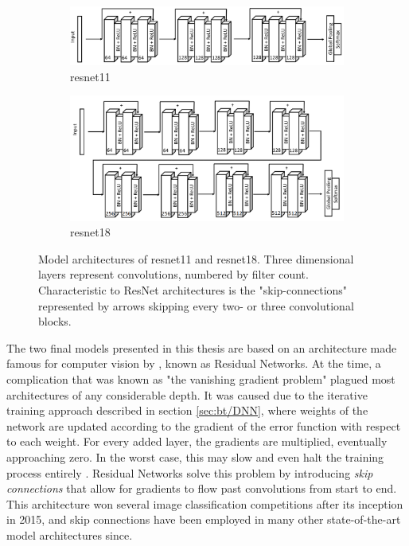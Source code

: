 \begin{figure}[h]
    \begin{subfigure}[b]{\textwidth}
        \includegraphics[width=\textwidth]{figures/impl_ResNet11.png}
        \caption{\acrfull{resnet11}}
        \label{fig:impl_ResNet11}
    \end{subfigure}
    \begin{subfigure}[b]{\textwidth}
        \includegraphics[width=\textwidth]{figures/impl_ResNet18.png}
        \caption{\acrfull{resnet18}}
        \label{fig:impl_ResNet18}
    \end{subfigure}
    \caption{Model architectures of \acrshort{resnet11} and \acrshort{resnet18}. Three dimensional layers represent convolutions, numbered by filter count. Characteristic to ResNet architectures is the "skip-connections" represented by arrows skipping every two- or three convolutional blocks.}
\end{figure}

The two final models presented in this thesis are based on an architecture made famous for computer vision by \textcite{he2015}, known as Residual Networks. At the time, a complication that was known as "the vanishing gradient problem"  plagued most architectures of any considerable depth. It was caused due to the iterative training approach described in section \ref{sec:bt/DNN}, where weights of the network are updated according to the gradient of the error function with respect to each weight. For every added layer, the gradients are multiplied, eventually approaching zero. In the worst case, this may slow and even halt the training process entirely \cite{basodi2020}. Residual Networks solve this problem by introducing \textit{skip connections} that allow for gradients to flow past convolutions from start to end. This architecture won several image classification competitions after its inception in 2015, and skip connections have been employed in many other state-of-the-art model architectures since.

